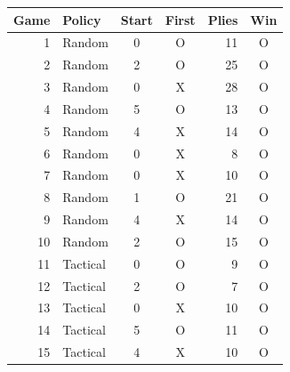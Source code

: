 \begin{tabular}{rlccrc}
\toprule
Game & Policy & Start & First & Plies & Win \\
\midrule
1 & Random & 0 & O & 11 & O \\
2 & Random & 2 & O & 25 & O \\
3 & Random & 0 & X & 28 & O \\
4 & Random & 5 & O & 13 & O \\
5 & Random & 4 & X & 14 & O \\
6 & Random & 0 & X & 8 & O \\
7 & Random & 0 & X & 10 & O \\
8 & Random & 1 & O & 21 & O \\
9 & Random & 4 & X & 14 & O \\
10 & Random & 2 & O & 15 & O \\
11 & Tactical & 0 & O & 9 & O \\
12 & Tactical & 2 & O & 7 & O \\
13 & Tactical & 0 & X & 10 & O \\
14 & Tactical & 5 & O & 11 & O \\
15 & Tactical & 4 & X & 10 & O \\
\bottomrule
\end{tabular}
